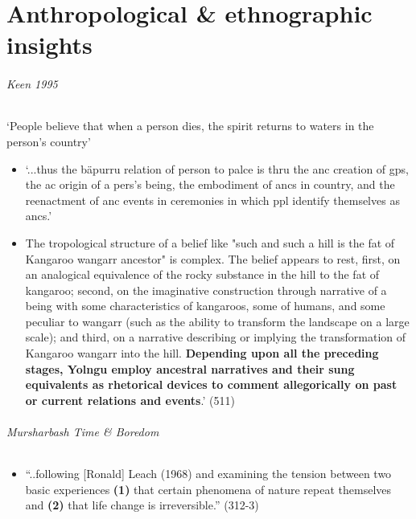 \documentclass[10pt]{article}
\begin{document}
\part{Anthropological \& ethnographic insights} \renewcommand\labelitemiii{\tiny$\square$}


	\paragraph{Keen 1995} `People believe that when a person dies, the spirit returns to waters in the person's country'
	\begin{itemize}
		\item `...thus the bäpurru relation of person to palce is thru the anc creation of gps, the ac origin of a pers's	being, the embodiment of ancs in country, and the reenactment of anc events in ceremonies in which ppl identify themselves as ancs.'
		\item\footnotesize The tropological structure of a belief like "such and such a hill is the fat of Kangaroo wangarr ancestor" is complex. The belief appears to rest, first, on an
analogical equivalence of the rocky substance in the hill to the fat of kangaroo; second, on the imaginative construction through narrative of a being with some characteristics of kangaroos, some of humans, and some peculiar to wangarr (such as the ability to transform the landscape on a large scale); and third, on a narrative describing or implying the transformation of Kangaroo wangarr into the hill. \textbf{Depending upon all the preceding stages, Yolngu employ ancestral narratives and their sung equivalents as rhetorical devices to comment allegorically on past or current relations and events}.' (511)\normalsize\end{itemize}
\paragraph{Mursharbash \textit{Time \& Boredom}}\begin{itemize}
\item ``..following [Ronald] Leach (1968) and examining the tension between two basic experiences \textbf{(1)} that certain phenomena of nature repeat themselves and \textbf{(2)} that life change is irreversible.'' (312-3)
	\end{itemize}
\end{document}
